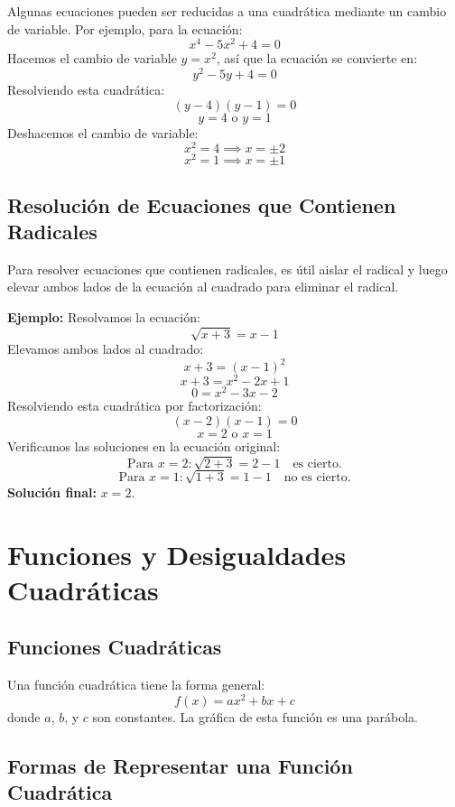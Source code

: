     Algunas ecuaciones pueden ser reducidas a una cuadrática mediante un cambio de variable. Por ejemplo, para la ecuación:
    \[
    x^4 - 5x^2 + 4 = 0
    \]
    Hacemos el cambio de variable \(y = x^2\), así que la ecuación se convierte en:
    \[
    y^2 - 5y + 4 = 0
    \]
    Resolviendo esta cuadrática:
    \[
    (y - 4)(y - 1) = 0
    \]
    \[
    y = 4 \text{ o } y = 1
    \]
    Deshacemos el cambio de variable:
    \[
    x^2 = 4 \implies x = \pm 2
    \]
    \[
    x^2 = 1 \implies x = \pm 1
    \]
    
    \subsection{Resolución de Ecuaciones que Contienen Radicales}
    
    Para resolver ecuaciones que contienen radicales, es útil aislar el radical y luego elevar ambos lados de la ecuación al cuadrado para eliminar el radical.
    
    \textbf{Ejemplo:} Resolvamos la ecuación:
    \[
    \sqrt{x + 3} = x - 1
    \]
    Elevamos ambos lados al cuadrado:
    \[
    x + 3 = (x - 1)^2
    \]
    \[
    x + 3 = x^2 - 2x + 1
    \]
    \[
    0 = x^2 - 3x - 2
    \]
    Resolviendo esta cuadrática por factorización:
    \[
    (x - 2)(x - 1) = 0
    \]
    \[
    x = 2 \text{ o } x = 1
    \]
    Verificamos las soluciones en la ecuación original:
    \[
    \text{Para } x = 2: \sqrt{2 + 3} = 2 - 1 \quad \text{es cierto.}
    \]
    \[
    \text{Para } x = 1: \sqrt{1 + 3} = 1 - 1 \quad \text{no es cierto.}
    \]
    \textbf{Solución final:} \(x = 2\).






    \section{Funciones y Desigualdades Cuadráticas} %

    \subsection{Funciones Cuadráticas}
    
    Una función cuadrática tiene la forma general:
    \[
    f(x) = ax^2 + bx + c
    \]
    donde \(a\), \(b\), y \(c\) son constantes. La gráfica de esta función es una parábola.
    
    \subsection{Formas de Representar una Función Cuadrática}
    
